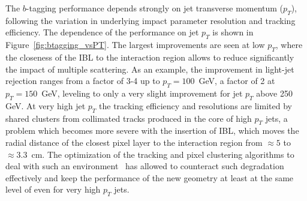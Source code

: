 The $b$-tagging performance depends strongly on jet transverse momentum ($p_{T}$),
following the variation in underlying impact parameter resolution and tracking efficiency. The dependence of the performance on jet $p_{T}$ is shown in Figure~\ref{fig:btagging_vsPT}.
The largest improvements are seen at low $p_{T}$, where the closeness of the IBL to the interaction region allows to reduce significantly the impact of multiple scattering. As an example, the improvement in light-jet rejection ranges from a factor of 3-4 up to $p_{T}=100$~GeV, a factor of 2 at $p_{T}=150$~GeV, leveling to only a very slight  improvement for jet $p_{T}$ above 250 GeV. At very high jet $p_{T}$ the tracking efficiency and resolutions are limited by shared clusters from collimated tracks produced in the core of high $p_{T}$ jets, a problem which becomes more severe with the insertion of IBL, which moves the radial distance of the closest pixel layer to the interaction region from $\approx 5$ to $\approx 3.3$~cm. The optimization of the tracking and pixel clustering algorithms to deal with such an environment~\cite{Aad:2014yva,ATL-PHYS-PUB-2015-006} has allowed to counteract such degradation effectively and keep the performance of the new \runtwo geometry at least at the same level of \runone even for very high $p_{T}$ jets. 


